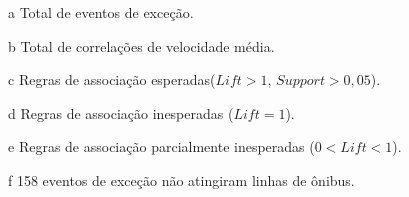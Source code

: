 \documentclass[
	12pt,				%
	oneside,			%
	a4paper,			%
	english,			%
	brazil				%
	]{abntex2ppgsi}
\begin{document}
{{\begin{apendicesenv}
\begin{table}[!htb]
\begin{threeparttable}
\begin{tablenotes}
            \item[a] Total de eventos de exceção.
            \item[b] Total de correlações de velocidade média.
            \item[c] Regras de associação esperadas($Lift > 1$, $Support > 0,05$).
            \item[d] Regras de associação inesperadas ($Lift = 1$).
            \item[e] Regras de associação parcialmente inesperadas ($0 < Lift < 1$).
            \item[f] 158 eventos de exceção não atingiram linhas de ônibus.
        \end{tablenotes}
\end{threeparttable}
\end{table}



\end{apendicesenv}}}
\end{document}

